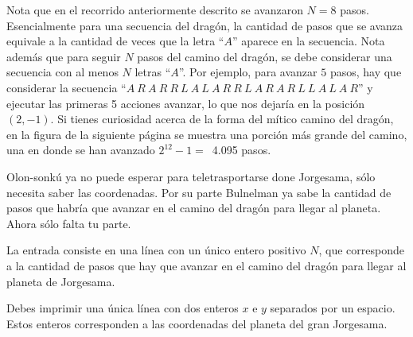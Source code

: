 \documentclass{oci}
\begin{document}
Nota que en el recorrido anteriormente descrito se avanzaron $N=8$ pasos. Esencialmente para una secuencia del dragón, la cantidad de pasos que se avanza equivale a la cantidad de veces que la letra ``$A$'' aparece en la secuencia.
Nota además que para seguir $N$ pasos del camino del dragón, se debe considerar una secuencia con al menos $N$ letras ``$A$''. 
Por ejemplo, para avanzar $5$ pasos, hay que considerar la secuencia ``$A\ R\ A\ R\ R\ L\ A\ L\ A\ R\ R\ L\ A\ R\ A\ R\ L\ L\ A\ L\ A\ R$'' y ejecutar
las primeras 5 acciones avanzar, lo que nos dejaría en la posición $(2,-1)$.
Si tienes curiosidad acerca de la forma del mítico camino del dragón, en la figura de la siguiente página se muestra una porción más grande del camino, una en donde se han avanzado $2^{12}-1=$\ 4.095 pasos.


Olon-sonkú ya no puede esperar para teletrasportarse done Jorgesama, sólo necesita saber las coordenadas. Por su parte Bulnelman ya sabe la cantidad de pasos que habría que avanzar en el camino del dragón para llegar al planeta. Ahora sólo falta tu parte.


\begin{inputDescription}
La entrada consiste en una línea con un único entero positivo $N$, que corresponde a la cantidad de pasos que hay que avanzar en el camino del dragón para llegar al planeta de Jorgesama.
\end{inputDescription}

\begin{outputDescription}
Debes imprimir una única línea con dos enteros $x$ e $y$ separados por un espacio.
Estos enteros corresponden a las coordenadas del planeta del gran Jorgesama.
\end{outputDescription}
\end{document}
